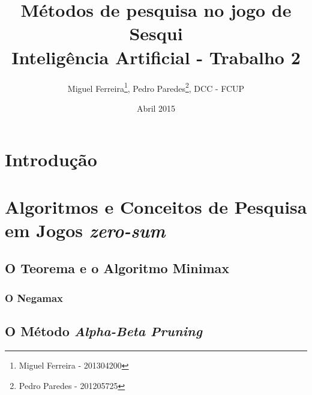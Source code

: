 \documentclass[12pt,a4paper,oneside]{article}
\title{Métodos de pesquisa no jogo de Sesqui\\
  \vspace{0.1in}
  \large{Inteligência Artificial - Trabalho 2}
}
\author{Miguel Ferreira\footnote{Miguel Ferreira - 201304200}, Pedro Paredes\footnote{Pedro Paredes - 201205725}, DCC - FCUP}
\date{Abril 2015}
\begin{document}
\maketitle


\section{Introdução}
\label{sec:intro}

\lipsum[1]

\lipsum[2]

\lipsum[3]

\lipsum[4]


\section{Algoritmos e Conceitos de Pesquisa em Jogos \textit{zero-sum}}
\label{sec:algconc}

\cite{Dutra:2015}
\lipsum[1]

\lipsum[2]

\lipsum[3]

\subsection{O Teorema e o Algoritmo Minimax}

\lipsum[1]

\lipsum[2]

\lipsum[3]

\lipsum[4]

\subsubsection{O Negamax}

\lipsum[1]

\lipsum[2]

\subsection{O Método \textit{Alpha-Beta Pruning}}
\end{document}
